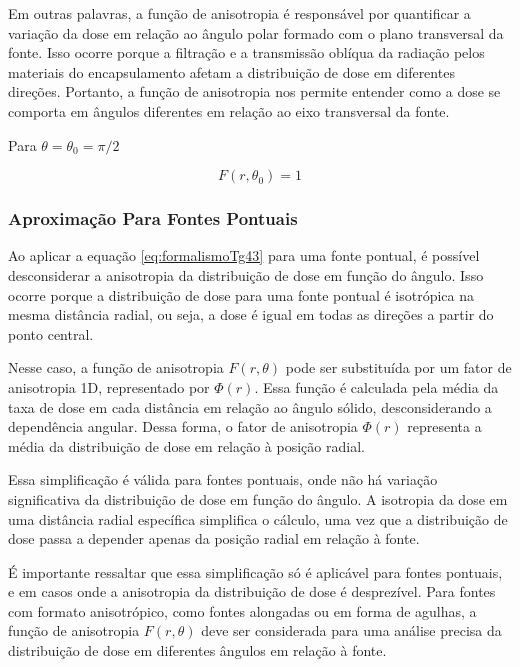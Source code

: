 \documentclass[11pt,a4paper]{article}
\newcounter{exemplo}
\begin{document}
\begin{exemplo}[onde,]
\begin{itemize}
				Em outras palavras, a função de anisotropia é responsável por quantificar a variação da dose em relação ao ângulo polar formado com o plano transversal da fonte. Isso ocorre porque a filtração e a transmissão oblíqua da radiação pelos materiais do encapsulamento afetam a distribuição de dose em diferentes direções. Portanto, a função de anisotropia nos permite entender como a dose se comporta em ângulos diferentes em relação ao eixo transversal da fonte.
				
					Para $\theta = \theta_0 = \pi/2$

					$$F(r, \theta_0) = 1$$

			\end{itemize}
		\end{exemplo}

\subsubsection*{Aproximação Para Fontes Pontuais}
			
			Ao aplicar a equação \ref{eq:formalismoTg43} para uma fonte pontual, é possível desconsiderar a anisotropia da distribuição de dose em função do ângulo. Isso ocorre porque a distribuição de dose para uma fonte pontual é isotrópica na mesma distância radial, ou seja, a dose é igual em todas as direções a partir do ponto central.

			Nesse caso, a função de anisotropia $F(r, \theta)$ pode ser substituída por um fator de anisotropia 1D, representado por $\Phi(r)$. Essa função é calculada pela média da taxa de dose em cada distância em relação ao ângulo sólido, desconsiderando a dependência angular. Dessa forma, o fator de anisotropia $\Phi(r)$ representa a média da distribuição de dose em relação à posição radial.

			Essa simplificação é válida para fontes pontuais, onde não há variação significativa da distribuição de dose em função do ângulo. A isotropia da dose em uma distância radial específica simplifica o cálculo, uma vez que a distribuição de dose passa a depender apenas da posição radial em relação à fonte.

			É importante ressaltar que essa simplificação só é aplicável para fontes pontuais, e em casos onde a anisotropia da distribuição de dose é desprezível. Para fontes com formato anisotrópico, como fontes alongadas ou em forma de agulhas, a função de anisotropia $F(r, \theta)$ deve ser considerada para uma análise precisa da distribuição de dose em diferentes ângulos em relação à fonte.
			
\end{document}
